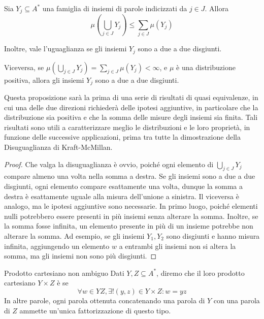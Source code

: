 \begin{proposition}[label=prop:dist_union_leq_sum_dist]{}
  Sia \(Y_j \subseteq A^*\) una famiglia di insiemi di parole indicizzati da \(j \in J\). 
  Allora
  \[\mu(\bigcup_{j \in J}Y_j) \leq \sum_{j\in J} \mu(Y_j)\]

  Inoltre, vale l'uguaglianza se gli insiemi \(Y_j\) sono a due a due disgiunti.

  Viceversa, se \(\mu(\bigcup_{j \in J}Y_j) = \sum_{j\in J} \mu(Y_j) < \infty\), e \(\mu\) è una distribuzione positiva, allora gli insiemi \(Y_j\) sono a due a due disgiunti.
\end{proposition}

Questa proposizione sarà la prima di una serie di risultati di quasi equivalenze, in cui una delle due direzioni richiederà delle ipotesi aggiuntive, in particolare che la distribuzione sia positiva e che la somma delle misure degli insiemi sia finita.
Tali risultati sono utili a caratterizzare meglio le distribuzioni e le loro proprietà, in funzione delle successive applicazioni, prima tra tutte la dimostrazione della Disuguaglianza di Kraft-McMillan.

\begin{proof}
  Che valga la disuguaglianza è ovvio, poiché ogni elemento di \(\bigcup_{j \in J}Y_j\) compare almeno una volta nella somma a destra.
  Se gli insiemi sono a due a due disgiunti, ogni elemento compare esattamente una volta, dunque la somma a destra è esattamente uguale alla misura dell'unione a sinistra.
  Il viceversa è analogo, ma le ipotesi aggiuntive sono necessarie.
  In primo luogo, poiché elementi nulli potrebbero essere presenti in più insiemi senza alterare la somma.
  Inoltre, se la somma fosse infinita, un elemento presente in più di un insieme potrebbe non alterare la somma.
  Ad esempio, se gli insiemi \(Y_1,Y_2\) sono disgiunti e hanno misura infinita, aggiungendo un elemento \(w\) a entrambi gli insiemi non si altera la somma, ma gli insiemi non sono più disgiunti.
\end{proof}

\begin{definition}{Prodotto cartesiano non ambiguo}
  Dati \(Y,Z \subseteq A^*\), diremo che il loro prodotto cartesiano \(Y\times Z\) è  se
    \[\forall w \in YZ, \exists! (y,z) \in Y \times Z : w = yz\]
  In altre parole, ogni parola ottenuta concatenando una parola di \(Y\) con una parola di \(Z\) ammette un'unica fattorizzazione di questo tipo.
\end{definition}

